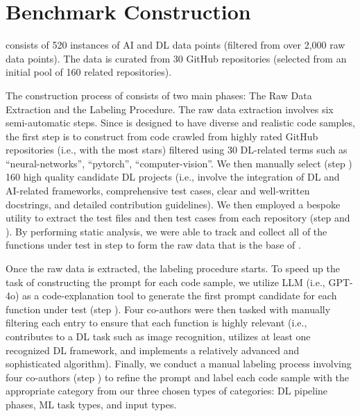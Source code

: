 \section{Benchmark Construction}
\label{sec:BenchConstr}




\tool consists of 520 instances of AI and DL data points (filtered from over 2,000 raw data points). The data is curated from 30 GitHub repositories (selected from an initial pool of 160 related repositories).

The construction process of \tool consists of two main phases: The Raw Data Extraction and the Labeling Procedure. The raw data extraction involves six semi-automatic steps. Since \tool is designed to have diverse and realistic code samples, the first step  is to construct \tool from code crawled from highly rated GitHub repositories (i.e., with the most stars) filtered using 30 DL-related terms such as ``neural-networks'',  ``pytorch'', ``computer-vision''. We then manually select (step ) 160 high quality candidate DL projects 
(i.e., involve the integration of DL and AI-related frameworks, comprehensive test cases, clear and well-written docstrings, and detailed contribution guidelines). We then employed a bespoke utility to extract the test files and then test cases from each repository (step  and ). By performing static analysis, we were able to track and collect all of the functions under test in step  to form the raw data that is the base of \tool. 

Once the raw data is extracted, the labeling procedure starts. To speed up the task of constructing the prompt for each code sample, we utilize LLM (i.e., GPT-4o) as a code-explanation tool\cite{nam2024using} to generate the first prompt candidate for each function under test (step ). Four co-authors were then tasked with manually filtering each entry to ensure that each function is highly relevant (i.e., contributes to a DL task such as image recognition, utilizes at least one recognized DL framework, and implements a relatively advanced and sophisticated algorithm).
Finally, we conduct a manual labeling process involving four co-authors (step ) to refine the prompt and label each code sample with the appropriate category from our three chosen types of categories: DL pipeline phases, ML task types, and input types.


